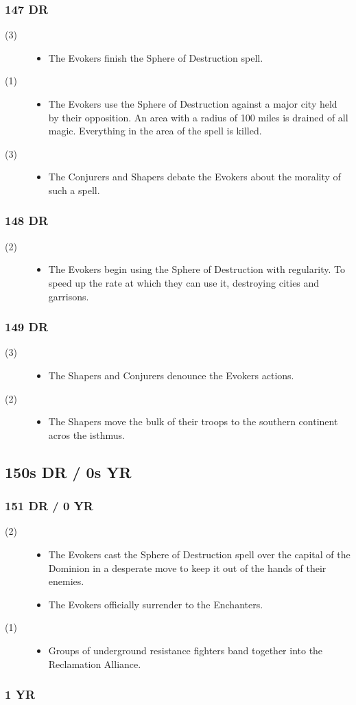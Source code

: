 \documentclass[a4paper, 11pt]{article}
\def\level#1{\item[(#1)\hspace{9.5pt}]}
\newenvironment{knowlevels}{\begin{description}}{\end{description}} %
\def\decadeblk#1{\subsection{#1}}
\def\yearblk#1{\subsubsection{#1}}
\begin{document}
\yearblk{147 DR}
\begin{knowlevels}
\level{3} {
\begin{itemize}
\item The Evokers finish the Sphere of Destruction spell.
\end{itemize}
}
\level{1} {
\begin{itemize}
\item The Evokers use the Sphere of Destruction against a major city held by their opposition. An area with a radius of 100 miles is drained of all magic. Everything in the area of the spell is killed.
\end{itemize}
}
\level{3} {
\begin{itemize}
\item The Conjurers and Shapers debate the Evokers about the morality of such a spell.
\end{itemize}
}
\end{knowlevels}

\yearblk{148 DR}
\begin{knowlevels}
\level{2} {
\begin{itemize}
\item The Evokers begin using the Sphere of Destruction with regularity. To speed up the rate at which they can use it, destroying cities and garrisons.
\end{itemize}
}
\end{knowlevels}

\yearblk{149 DR}
\begin{knowlevels}
\level{3} {
\begin{itemize}
\item The Shapers and Conjurers denounce the Evokers actions.
\end{itemize}
}
\level{2} {
\begin{itemize}
\item The Shapers move the bulk of their troops to the southern continent acros the isthmus.
\end{itemize}
}
\end{knowlevels}

\decadeblk{150s DR / 0s YR}
\yearblk{151 DR / 0 YR}
\begin{knowlevels}
\level{2} {
\begin{itemize}
\item The Evokers cast the Sphere of Destruction spell over the capital of the Dominion in a desperate move to keep it out of the hands of their enemies.
\item The Evokers officially surrender to the Enchanters.
\end{itemize}
}
\level{1} {
\begin{itemize}
\item Groups of underground resistance fighters band together into the Reclamation Alliance.
\end{itemize}
}
\end{knowlevels}

\yearblk{1 YR}
\end{document}
